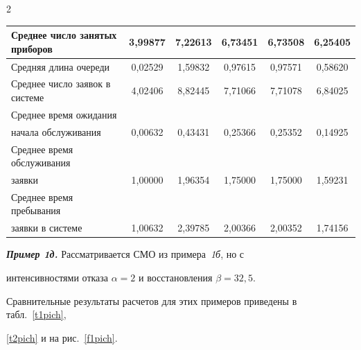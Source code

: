 \begin{multicols}{2}
\begin{table}
\begin{center}
\begin{tabular}{|l|c|c|c|c|c|}
\hline


Среднее число занятых приборов              & 3,99877 & 7,22613 & 6,73451 & 6,73508 & 6,25405 \\


\hline


Средняя длина очереди                       & 0,02529 & 1,59832 & 0,97615 & 0,97571 & 0,58620 \\


\hline


Среднее число заявок в системе              & 4,02406 & 8,82445 & 7,71066 & 7,71078 & 6,84025 \\


\hline


Среднее время ожидания & & & & & \\


начала обслуживания                         & 0,00632 & 0,43431 & 0,25366 & 0,25352 & 0,14925 \\


\hline


Среднее время обслуживания && & & & \\


заявки                                      & 1,00000 & 1,96354 & 1,75000 & 1,75000 & 1,59231 \\


\hline


Среднее время пребывания & & && & \\


заявки в системе                            & 1,00632 & 2,39785 & 2,00366 & 2,00352 & 1,74156 \\


\hline


\end{tabular}


\end{center}


\end{table}


{\bfseries\textit{Пример 1д.}} Рассматривается СМО из примера~\textit{1б}, но с 


интенсивностями отказа $\alpha = 2$ и восстановления $\beta= 32{,}5$.





Сравнительные результаты расчетов для этих примеров приведены в табл.~\ref{t1pich},


\ref{t2pich} и на рис.~\ref{f1pich}.









\end{multicols}
